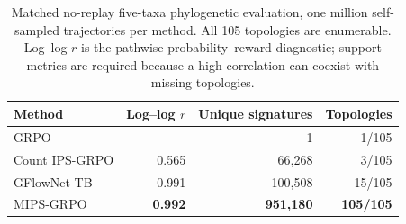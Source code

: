 \begin{table}[htbp]
\centering
\caption{Matched no-replay five-taxa phylogenetic evaluation, one million
self-sampled trajectories per method. All 105 topologies are enumerable.
Log--log \(r\) is the pathwise probability--reward diagnostic; support metrics
are required because a high correlation can coexist with missing topologies.}
\label{tab:phylo-main}
\begin{tabular}{lrrr}
\toprule
Method & Log--log \(r\) & Unique signatures & Topologies \\
\midrule
GRPO & --- & 1 & 1/105 \\
Count IPS-GRPO & 0.565 & 66,268 & 3/105 \\
GFlowNet TB & 0.991 & 100,508 & 15/105 \\
MIPS-GRPO & \textbf{0.992} & \textbf{951,180} & \textbf{105/105} \\
\bottomrule
\end{tabular}
\end{table}
